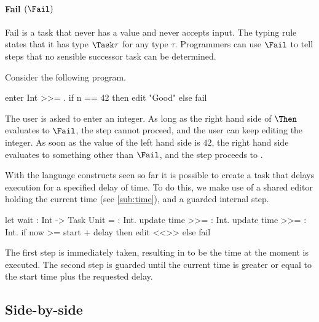 \paragraph{Fail $(\Fail)$}
\label{sub:fail}

Fail is a task that never has a value and never accepts input.
The typing rule  states that it has type $\Task \tau$ for any type $\tau$.
Programmers can use $\Fail$ to tell steps that no sensible successor task can be determined.

\begin{example}

Consider the following program.
\begin{TASK}
  enter Int >>= \n. if n == 42 then edit "Good" else fail
\end{TASK}
The user is asked to enter an integer.
As long as the right hand side of $\Then$ evaluates to $\Fail$, the step cannot proceed, and the user can keep editing the integer.
As soon as the value of the left hand side is $42$, the right hand side evaluates to something other than $\Fail$, and the step proceeds to .

\end{example}



\begin{example}[Waiting]\label{exm:wait}

With the language constructs seen so far it is possible to create a task that delays execution for a specified delay of time.
To do this,
we make use of a shared editor holding the current time (see \cref{sub:time}),
and a guarded internal step.
\begin{TASK}
  let wait : Int -> Task Unit = \delay : Int.
    update time >>= \start : Int.
    update time >>= \now : Int.
      if now >= start + delay then edit <<>> else fail
\end{TASK}
The first step is immediately taken, resulting in  to be the time at the moment  is executed.
The second step is guarded until the current time is greater or equal to the start time plus the requested delay.

\end{example}



\subsection{Side-by-side}



